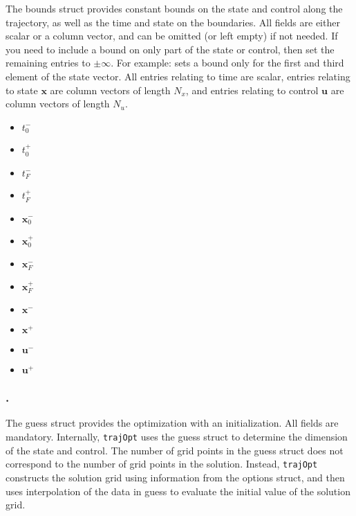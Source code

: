 The bounds struct provides constant bounds on the state and control along the trajectory, as well as the time and state on the boundaries. All fields are either scalar or a column vector, and can be omitted (or left empty) if not needed. If you need to include a bound on only part of the state or control, then set the remaining entries to $\pm\infty$. For example:  sets a bound only for the first and third element of the state vector. All entries relating to time are scalar, entries relating to state $\bm{x}$ are column vectors of length $N_x$, and entries relating to control $\bm{u}$ are column vectors of length $N_u$.
\begin{itemize} \setlength\itemsep{-0.1em}
\item {}\tc{ = }$t_0^-$ 
\item {}\tc{ = }$t_0^+$ 
\item {}\tc{ = }$t_F^-$ 
\item {}\tc{ = }$t_F^+$ 
\item {}\tc{ = }$\bm{x}_0^-$ 
\item {}\tc{ = }$\bm{x}_0^+$ 
\item {}\tc{ = }$\bm{x}_F^-$ 
\item {}\tc{ = }$\bm{x}_F^+$ 
\item {}\tc{ = }$\bm{x}^-$ 
\item {}\tc{ = }$\bm{x}^+$ 
\item {}\tc{ = }$\bm{u}^-$ 
\item {}\tc{ = }$\bm{u}^+$ 
\end{itemize}
 

\subsubsection*{.}

The guess struct provides the optimization with an initialization. All fields are mandatory. Internally, \texttt{trajOpt} uses the guess struct to determine the dimension of the state and control. The number of grid points in the guess struct does not correspond to the number of grid points in the solution. Instead, \texttt{trajOpt} constructs the solution grid using information from the options struct, and then uses interpolation of the data in guess to evaluate the initial value of the solution grid.

